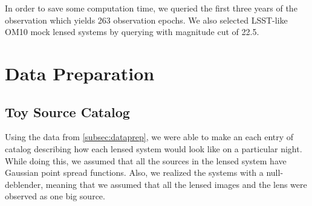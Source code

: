 \documentclass[\docopts]{\docclass}
\begin{document}
In order to save some computation time, we queried the first three years of the observation which yields 263 observation epochs. We also selected LSST-like OM10 mock lensed systems by querying with magnitude cut of 22.5. 


\section{Data Preparation}
\label{sssec:catalog}
\subsection{Toy Source Catalog}

\label{sssec:toysource}

Using the data from \ref{subsec:dataprep}, we were able to make an each entry of catalog describing how each lensed system would look like on a particular night. While doing this, we assumed that all the sources in the lensed system have Gaussian point spread functions. Also, we realized the systems with a null-deblender, meaning that we assumed that all the lensed images and the lens were observed as one big source.
\end{document}
